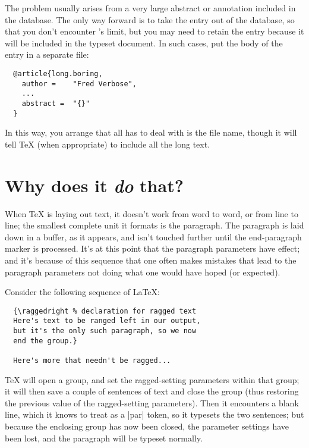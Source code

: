 \begin{changemargin}{-1cm}{-1cm}
The problem usually arises from a very large abstract or annotation
included in the database.  The only way forward is to take the entry
out of the database, so that you don't encounter \BibTeX{}'s limit,
but you may need to retain the entry because it will be included in
the typeset document.  In such cases, put the body of the entry in a separate
file:
\begin{verbatim}
  @article{long.boring,
    author =    "Fred Verbose",
    ...
    abstract =  "{}"
  }
\end{verbatim}
In this way, you arrange that all \BibTeX{} has to deal with is the
file name, though it will tell \TeX{} (when appropriate) to include
all the long text.


\section{Why does it \emph{do} that?}


When \TeX{} is laying out text, it doesn't work from word to word, or
from line to line; the smallest complete unit it formats is the
paragraph.  The paragraph is laid down in a buffer, as it appears, and
isn't touched further until the end-paragraph marker is processed.
It's at this point that the paragraph parameters have effect; and it's
because of this sequence that one often makes mistakes that lead to
the paragraph parameters not doing what one would have hoped (or
expected).

Consider the following sequence of \LaTeX{}:
\begin{verbatim}
  {\raggedright % declaration for ragged text
  Here's text to be ranged left in our output,
  but it's the only such paragraph, so we now
  end the group.}

  Here's more that needn't be ragged...
\end{verbatim}
\TeX{} will open a group, and set the ragged-setting parameters within
that group; it will then save a couple of sentences of text and
close the group (thus restoring the previous value of the
ragged-setting parameters).  Then it encounters a blank line, which it
knows to treat as a \cs|par| token, so it typesets the two sentences;
but because the enclosing group has now been closed, the parameter
settings have been lost, and the paragraph will be typeset normally.


\end{changemargin}
